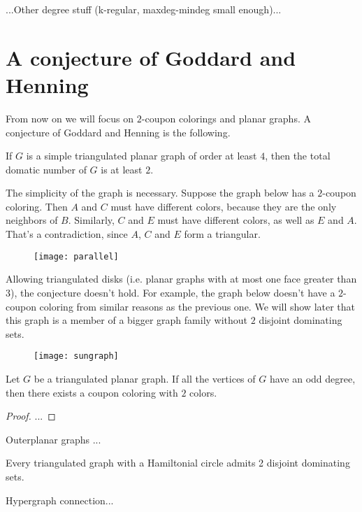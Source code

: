...Other degree stuff (k-regular, maxdeg-mindeg small enough)...

\section{A conjecture of Goddard and Henning}

From now on we will focus on $2$-coupon colorings and planar graphs. A
conjecture of Goddard and Henning is the following.

\begin{conj}
  If $G$ is a simple triangulated planar graph of order at least $4$, then the
  total domatic number of $G$ is at least $2$.
\end{conj}

\begin{remark}
  The simplicity of the graph is necessary. Suppose the graph below has a
  $2$-coupon coloring. Then $A$ and $C$ must have different colors, because
  they are the only neighbors of $B$. Similarly, $C$ and $E$ must have different
  colors, as well as $E$ and $A$. That's a contradiction, since $A$, $C$ and
  $E$ form a triangular.
\end{remark}

\begin{figure}[h]
  \centering
  \texttt{[image: parallel]}
\end{figure}

\begin{remark}
  Allowing triangulated disks (i.e. planar graphs with at most one face greater
  than $3$), the conjecture doesn't hold. For example, the graph below doesn't
  have a $2$-coupon coloring from similar reasons as the previous one. We will
  show later that this graph is a member of a bigger graph family without $2$
  disjoint dominating sets.
\end{remark}

\begin{figure}[h]
  \centering
  \texttt{[image: sungraph]}
\end{figure}

\begin{thm}
  Let $G$ be a triangulated planar graph. If all the vertices of $G$ have an
  odd degree, then there exists a coupon coloring with $2$ colors.
\end{thm}
\begin{proof}
  ...
\end{proof}

\begin{thm}
  Outerplanar graphs ...
\end{thm}

\begin{thm}
  Every triangulated graph with a Hamiltonial circle admits 2 disjoint
  dominating sets.
\end{thm}

Hypergraph connection...
